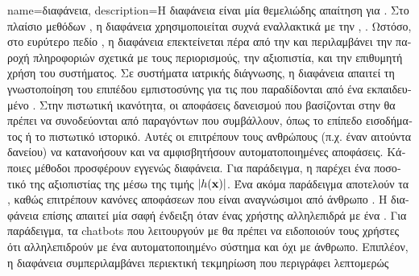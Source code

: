 {name={\foreignlanguage{greek}{διαφάνεια}},
	description={\foreignlanguage{greek}{Η διαφάνεια} 
		\foreignlanguage{greek}{είναι μία θεμελιώδης απαίτηση για} 
		 \cite{HLEGTrustworhtyAI}. \foreignlanguage{greek}{Στο πλαίσιο μεθόδων} 
		, \foreignlanguage{greek}{η διαφάνεια χρησιμοποιείται συχνά εναλλακτικά με την} 
		 \cite{JunXML2020}, \cite{gallese2023ai}. 
		\foreignlanguage{greek}{Ωστόσο, στο ευρύτερο πεδίο} , 
		\foreignlanguage{greek}{η διαφάνεια επεκτείνεται πέρα από την}  
		\foreignlanguage{greek}{και περιλαμβάνει την παροχή πληροφοριών σχετικά με τους περιορισμούς,  
		την αξιοπιστία, και την επιθυμητή χρήση του συστήματος. Σε συστήματα ιατρικής διάγνωσης,
		η διαφάνεια απαιτεί τη γνωστοποίηση του επιπέδου εμπιστοσύνης για τις}  
		\foreignlanguage{greek}{που παραδίδονται από ένα εκπαιδευμένο} . 
		\foreignlanguage{greek}{Στην πιστωτική ικανότητα, οι αποφάσεις δανεισμού που βασίζονται στην} 
		 \foreignlanguage{greek}{θα πρέπει να συνοδεύονται από}  
		\foreignlanguage{greek}{παραγόντων που συμβάλλουν, όπως το επίπεδο εισοδήματος ή το πιστωτικό 
		ιστορικό. Αυτές οι}  \foreignlanguage{greek}{επιτρέπουν τους ανθρώπους
		(π.χ. έναν αιτούντα δανείου) να κατανοήσουν και να αμφισβητήσουν αυτοματοποιημένες αποφάσεις.  
		Κάποιες μέθοδοι}  \foreignlanguage{greek}{προσφέρουν εγγενώς διαφάνεια. 
		Για παράδειγμα, η}  \foreignlanguage{greek}{παρέχει ένα ποσοτικό}
		 \foreignlanguage{greek}{της αξιοπιστίας της}  
		\foreignlanguage{greek}{μέσω της τιμής $|h({\bf x})|$. Ένα ακόμα παράδειγμα αποτελούν τα}
		, \foreignlanguage{greek}{καθώς επιτρέπουν κανόνες αποφάσεων 
		που είναι αναγνώσιμοι από άνθρωπο} \cite{rudin2019stop}.
		\foreignlanguage{greek}{Η διαφάνεια επίσης απαιτεί μία σαφή ένδειξη όταν ένας χρήστης αλληλεπιδρά  
		με ένα} . \foreignlanguage{greek}{Για παράδειγμα, τα} chatbots
		\foreignlanguage{greek}{που λειτουργούν με}  \foreignlanguage{greek}{θα πρέπει να 
		ειδοποιούν τους χρήστες ότι αλληλεπι\-δρούν με ένα αυτοματοποιημένo σύστημα και όχι με άνθρωπο. 
		Επιπλέον, η διαφάνεια συμπεριλαμβάνει περιεκτική τεκμηρίωση που περιγράφει λεπτομερώς 
}}}
